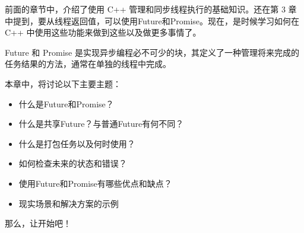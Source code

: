 前面的章节中，介绍了使用 C++ 管理和同步线程执行的基础知识。还在第 3 章中提到，要从线程返回值，可以使用Future和Promise。现在，是时候学习如何在 C++ 中使用这些功能来做到这些以及做更多事情了。

Future 和 Promise 是实现异步编程必不可少的块，其定义了一种管理将来完成的任务结果的方法，通常在单独的线程中完成。

本章中，将讨论以下主要主题：

\begin{itemize}
\item
什么是Future和Promise？

\item
什么是共享Future？与普通Future有何不同？

\item
什么是打包任务以及何时使用？

\item
如何检查未来的状态和错误？

\item
使用Future和Promise有哪些优点和缺点？

\item
现实场景和解决方案的示例
\end{itemize}

那么，让开始吧！